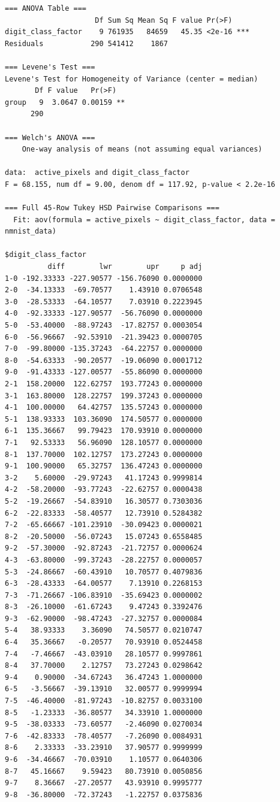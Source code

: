 \begin{verbatim}
=== ANOVA Table ===
                     Df Sum Sq Mean Sq F value Pr(>F)    
digit_class_factor    9 761935   84659   45.35 <2e-16 ***
Residuals           290 541412    1867                   

=== Levene's Test ===
Levene's Test for Homogeneity of Variance (center = median)
       Df F value   Pr(>F)   
group   9  3.0647 0.00159 **
      290                    

=== Welch's ANOVA ===
	One-way analysis of means (not assuming equal variances)

data:  active_pixels and digit_class_factor
F = 68.155, num df = 9.00, denom df = 117.92, p-value < 2.2e-16

=== Full 45-Row Tukey HSD Pairwise Comparisons ===
  Fit: aov(formula = active_pixels ~ digit_class_factor, data = nmnist_data)

$digit_class_factor
          diff        lwr        upr     p adj
1-0 -192.33333 -227.90577 -156.76090 0.0000000
2-0  -34.13333  -69.70577    1.43910 0.0706548
3-0  -28.53333  -64.10577    7.03910 0.2223945
4-0  -92.33333 -127.90577  -56.76090 0.0000000
5-0  -53.40000  -88.97243  -17.82757 0.0003054
6-0  -56.96667  -92.53910  -21.39423 0.0000705
7-0  -99.80000 -135.37243  -64.22757 0.0000000
8-0  -54.63333  -90.20577  -19.06090 0.0001712
9-0  -91.43333 -127.00577  -55.86090 0.0000000
2-1  158.20000  122.62757  193.77243 0.0000000
3-1  163.80000  128.22757  199.37243 0.0000000
4-1  100.00000   64.42757  135.57243 0.0000000
5-1  138.93333  103.36090  174.50577 0.0000000
6-1  135.36667   99.79423  170.93910 0.0000000
7-1   92.53333   56.96090  128.10577 0.0000000
8-1  137.70000  102.12757  173.27243 0.0000000
9-1  100.90000   65.32757  136.47243 0.0000000
3-2    5.60000  -29.97243   41.17243 0.9999814
4-2  -58.20000  -93.77243  -22.62757 0.0000438
5-2  -19.26667  -54.83910   16.30577 0.7303036
6-2  -22.83333  -58.40577   12.73910 0.5284382
7-2  -65.66667 -101.23910  -30.09423 0.0000021
8-2  -20.50000  -56.07243   15.07243 0.6558485
9-2  -57.30000  -92.87243  -21.72757 0.0000624
4-3  -63.80000  -99.37243  -28.22757 0.0000057
5-3  -24.86667  -60.43910   10.70577 0.4079836
6-3  -28.43333  -64.00577    7.13910 0.2268153
7-3  -71.26667 -106.83910  -35.69423 0.0000002
8-3  -26.10000  -61.67243    9.47243 0.3392476
9-3  -62.90000  -98.47243  -27.32757 0.0000084
5-4   38.93333    3.36090   74.50577 0.0210747
6-4   35.36667   -0.20577   70.93910 0.0524458
7-4   -7.46667  -43.03910   28.10577 0.9997861
8-4   37.70000    2.12757   73.27243 0.0298642
9-4    0.90000  -34.67243   36.47243 1.0000000
6-5   -3.56667  -39.13910   32.00577 0.9999994
7-5  -46.40000  -81.97243  -10.82757 0.0033100
8-5   -1.23333  -36.80577   34.33910 1.0000000
9-5  -38.03333  -73.60577   -2.46090 0.0270034
7-6  -42.83333  -78.40577   -7.26090 0.0084931
8-6    2.33333  -33.23910   37.90577 0.9999999
9-6  -34.46667  -70.03910    1.10577 0.0640306
8-7   45.16667    9.59423   80.73910 0.0050856
9-7    8.36667  -27.20577   43.93910 0.9995777
9-8  -36.80000  -72.37243   -1.22757 0.0375836
\end{verbatim}

